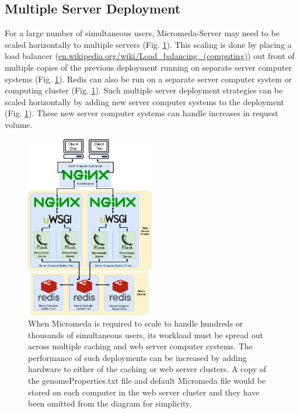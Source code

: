 \subsection{Multiple Server Deployment} \label{multi-server-micromeda-deployment}

For a large number of simultaneous users, Micromeda-Server may need to be scaled horizontally to multiple servers (Fig. \ref{fig:micromeda-large-deploy}). This scaling is done by placing a load balancer (\href{http://en.wikipedia.org/wiki/Load_balancing_(computing)}{en.wikipedia.org/wiki/Load\_balancing\_(computing)}) out front of multiple copies of the previous deployment running on separate server computer systems (Fig. \ref{fig:micromeda-large-deploy}). Redis can also be run on a separate server computer system or computing cluster (Fig. \ref{fig:micromeda-large-deploy}). Such multiple server deployment strategies can be scaled horizontally by adding new server computer systems to the deployment (Fig. \ref{fig:micromeda-large-deploy}). These new server computer systems can handle increases in request volume.

\begin{figure}[!ht]
  \centering
	\includegraphics[width=0.50\textwidth]{media/micromeda-heavy-deployment.pdf}
	 \caption{When Micromeda is required to scale to handle hundreds or thousands of simultaneous users, its workload must be spread out across multiple caching and web server computer systems. The performance of such deployments can be increased by adding hardware to either of the caching or web server clusters. A copy of the genomeProperties.txt file and default Micromeda file would be stored on each computer in the web server cluster and they have been omitted from the diagram for simplicity.}
	 \label{fig:micromeda-large-deploy}
\end{figure}

